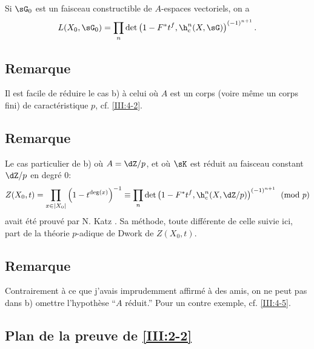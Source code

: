 Si $\sG_0$ est un faisceau constructible de $A$-espaces vectoriels, on a 
\[
  L(X_0,\sG_0) = \prod_n \det\left(1-F^* t^f,\h_c^n(X,\sG)\right)^{(-1)^{n+1}} \text{.}
\]





\subsection{Remarque}\label{III:2-5}

Il est facile de réduire le cas b) à celui où $A$ est un corps (voire 
même un corps fini) de caractéristique $p$, cf. \ref{III:4-2}. 





\subsection{Remarque}\label{III:2-6}

Le cas particulier de b) où $A=\dZ/p$, et où $\sK$ est réduit au faisceau 
constant $\dZ/p$ en degré $0$:
\[
  Z(X_0,t) = \prod_{x\in |X_0|} \left(1-t^{\deg(x)}\right)^{-1}
      \equiv \prod_n \det\left(1-F^* t^f,\h_c^n(X,\dZ/p)\right)^{(-1)^{n+1}} \pmod p
\]
avait été prouvé par N. Katz \cite[XXII 3.1]{sga7}. Sa méthode, toute 
différente de celle suivie ici, part de la théorie $p$-adique de Dwork de 
$Z(X_0,t)$. 





\subsection{Remarque}\label{III:2-7}


Contrairement à ce que j'avais imprudemment affirmé à des amis, on ne 
peut pas dans b) omettre l'hypothèse ``$A$ réduit.'' Pour un contre 
exemple, cf. \ref{III:4-5}. 





\subsection{Plan de la preuve de \ref{III:2-2}}\label{III:2-8}

